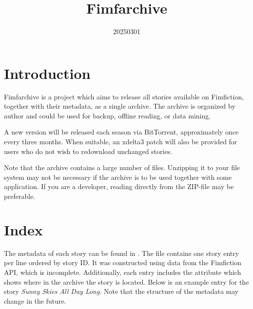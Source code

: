 \documentclass[hidelinks,a4paper,12pt]{article}
\begin{document}
\title{Fimfarchive}
\date{20250301}

\maketitle
\newpage
\tableofcontents
\newpage

\section{Introduction} \label{sec:introduction}

Fimfarchive is a project which aims to release all stories available on Fimfiction, together with their metadata, as a single archive. The archive is organized by author and could be used for backup, offline reading, or data mining.

A new version will be released each season via BitTorrent, approximately once every three months. When suitable, an xdelta3 patch will also be provided for users who do not wish to redownload unchanged stories.

Note that the archive contains a large number of files. Unzipping it to your file system may not be necessary if the archive is to be used together with some application. If you are a developer, reading directly from the ZIP-file may be preferable.


\section{Index} \label{sec:index}

The metadata of each story can be found in . The file contains one story entry per line ordered by story ID. It was constructed using data from the Fimfiction API, which is incomplete. Additionally, each entry includes the attribute  which shows where in the archive the story is located. Below is an example entry for the story \emph{Sunny Skies All Day Long}. Note that the structure of the metadata may change in the future.
\end{document}
